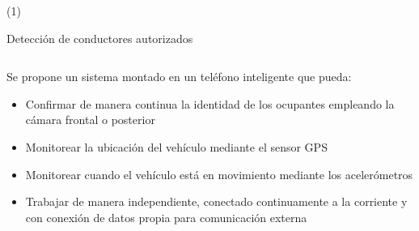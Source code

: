 



\begin{frame}{ \footnotemark (1)}
\begin{block}{Detección de conductores autorizados \footnotemark } 
\begin{columns}
\begin{column}{1.0\textwidth}
Se propone un sistema montado en un teléfono inteligente que pueda:
	\begin{itemize}
\item Confirmar de manera continua la identidad de los ocupantes empleando la cámara frontal o posterior
\item Monitorear la ubicación del vehículo mediante el sensor GPS
\item Monitorear cuando el vehículo está en movimiento mediante los acelerómetros
\item Trabajar de manera independiente, conectado continuamente a la corriente y con conexión de datos propia para comunicación externa
	\end{itemize}
\end{column}
\end{columns}
\end{block} 
\setcounter{footnote}{0}
\end{frame}


